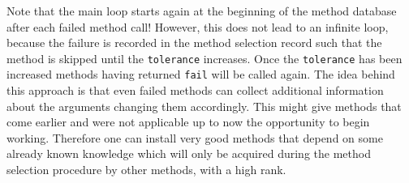 \documentclass[a4paper,11pt]{report}
\begin{document}
{{ Note that the main loop starts again at the beginning of the method database
after each failed method call! However, this does not lead to an infinite
loop, because the failure is recorded in the method selection record such that
the method is skipped until the \texttt{tolerance} increases. Once the \texttt{tolerance} has been increased methods having returned \texttt{fail} will be called again. The idea behind this approach is that even failed
methods can collect additional information about the arguments changing them
accordingly. This might give methods that come earlier and were not applicable
up to now the opportunity to begin working. Therefore one can install very
good methods that depend on some already known knowledge which will only be
acquired during the method selection procedure by other methods, with a high
rank.

 }

 

  }

  
\end{document}
